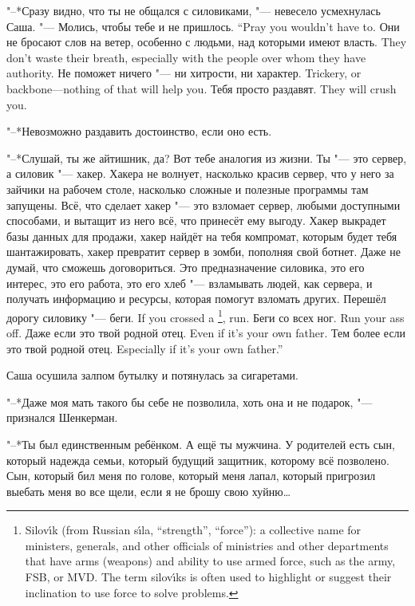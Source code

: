 "--*Сразу видно, что ты не общался с силовиками, "--- невесело усмехнулась Саша.
{"--- Молись, чтобы тебе и не пришлось.}
{``Pray you wouldn't have to.}
{Они не бросают слов на ветер, особенно с людьми, над которыми имеют власть.}
{They don't waste their breath, especially with the people over whom they have authority.}
{Не поможет ничего "--- ни хитрости, ни характер.}
{Trickery, or backbone---nothing of that will help you.}
{Тебя просто раздавят.}
{They will crush you.}

"--*Невозможно раздавить достоинство, если оно есть.

"--*Слушай, ты же айтишник, да?
Вот тебе аналогия из жизни.
Ты "--- это сервер, а силовик "--- хакер.
Хакера не волнует, насколько красив сервер, что у него за зайчики на рабочем столе, насколько сложные и полезные программы там запущены.
Всё, что сделает хакер "--- это взломает сервер, любыми доступными способами, и вытащит из него всё, что принесёт ему выгоду.
Хакер выкрадет базы данных для продажи, хакер найдёт на тебя компромат, которым будет тебя шантажировать, хакер превратит сервер в зомби, пополняя свой ботнет.
Даже не думай, что сможешь договориться.
Это предназначение силовика, это его интерес, это его работа, это его хлеб "--- взламывать людей, как сервера, и получать информацию и ресурсы, которая помогут взломать других.
{Перешёл дорогу силовику "--- беги.}
{If you crossed a \silovik\footnote{Silov\'{\i}k (from Russian s\'{\i}la, ``strength'', ``force''): a collective name for ministers, generals, and other officials of ministries and other departments that have arms (weapons) and ability to use armed force, such as the army, FSB, or MVD. The term silov\'{\i}ks is often used to highlight or suggest their inclination to use force to solve problems.}, run.}
{Беги со всех ног.}
{Run your ass off.}
{Даже если это твой родной отец.}
{Even if it's your own father.}
{Тем более если это твой родной отец.}
{Especially if it's your own father.''}

Саша осушила залпом бутылку и потянулась за сигаретами.

"--*Даже моя мать такого бы себе не позволила, хоть она и не подарок, "--- признался Шенкерман.

"--*Ты был единственным ребёнком.
А ещё ты мужчина.
У родителей есть сын, который надежда семьи, который будущий защитник, которому всё позволено.
Сын, который бил меня по голове, который меня лапал, который пригрозил выебать меня во все щели, если я не брошу свою хуйню\ldots{}

